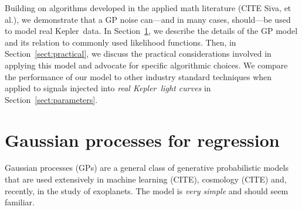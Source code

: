 \documentclass[12pt,preprint]{aastex}
\newcommand{\project}[1]{{\sffamily #1}}
\newcommand{\kepler}{\project{Kepler}}
\newcommand{\Sect}[1]{Section~\ref{sect:#1}}
\newcommand{\sect}[1]{\Sect{#1}}
\newcommand{\sectlabel}[1]{\label{sect:#1}}
\begin{document}
Building on algorithms developed in the applied math literature (CITE Siva, et
al.), we demonstrate that a GP noise can---and in many cases, should---be
used to model real \kepler\ data.
In \sect{gps}, we describe the details of the GP model and its relation to
commonly used likelihood functions.
Then, in \sect{practical}, we discuss the practical considerations involved in
applying this model and advocate for specific algorithmic choices.
We compare the performance of our model to other industry standard techniques
when applied to signals injected into \emph{real \kepler\ light curves} in
\sect{parameters}.

\section{Gaussian processes for regression}\sectlabel{gps}

Gaussian processes (GPs) are a general class of generative probabilistic
models that are used extensively in machine learning (CITE), cosmology (CITE)
and, recently, in the study of exoplanets.
The model is \emph{very simple} and should seem familiar.
\end{document}
